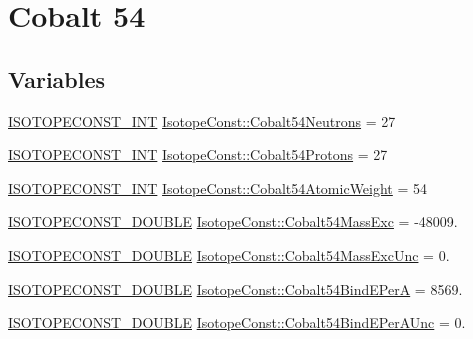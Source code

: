 \hypertarget{group___isotope_const-_cobalt-_co54}{}\section{Cobalt 54}
\label{group___isotope_const-_cobalt-_co54}
\subsection*{Variables}
\begin{DoxyCompactItemize}
\item 
\mbox{\hyperlink{group___isotope_const-_macros_ga5f18360b3e99483a35c32d789e62621c}{I\+S\+O\+T\+O\+P\+E\+C\+O\+N\+S\+T\+\_\+\+I\+NT}} \mbox{\hyperlink{group___isotope_const-_cobalt-_co54_ga5bce8fc322dd45ec0310e49514c6e6ec}{Isotope\+Const\+::\+Cobalt54\+Neutrons}} = 27
\item 
\mbox{\hyperlink{group___isotope_const-_macros_ga5f18360b3e99483a35c32d789e62621c}{I\+S\+O\+T\+O\+P\+E\+C\+O\+N\+S\+T\+\_\+\+I\+NT}} \mbox{\hyperlink{group___isotope_const-_cobalt-_co54_gaba4b7c7ce3abd41d7bd558b2879605fd}{Isotope\+Const\+::\+Cobalt54\+Protons}} = 27
\item 
\mbox{\hyperlink{group___isotope_const-_macros_ga5f18360b3e99483a35c32d789e62621c}{I\+S\+O\+T\+O\+P\+E\+C\+O\+N\+S\+T\+\_\+\+I\+NT}} \mbox{\hyperlink{group___isotope_const-_cobalt-_co54_ga1110cc20dc4a57d43c7eca903986067c}{Isotope\+Const\+::\+Cobalt54\+Atomic\+Weight}} = 54
\item 
\mbox{\hyperlink{group___isotope_const-_macros_ga8f45a7272ce02c0b4c65c44636ed719a}{I\+S\+O\+T\+O\+P\+E\+C\+O\+N\+S\+T\+\_\+\+D\+O\+U\+B\+LE}} \mbox{\hyperlink{group___isotope_const-_cobalt-_co54_ga0fdecb4aae12a7dc13ac787afb2917a1}{Isotope\+Const\+::\+Cobalt54\+Mass\+Exc}} = -\/48009.
\item 
\mbox{\hyperlink{group___isotope_const-_macros_ga8f45a7272ce02c0b4c65c44636ed719a}{I\+S\+O\+T\+O\+P\+E\+C\+O\+N\+S\+T\+\_\+\+D\+O\+U\+B\+LE}} \mbox{\hyperlink{group___isotope_const-_cobalt-_co54_gac0f16dce8a2ceaa2545490610eef9ef9}{Isotope\+Const\+::\+Cobalt54\+Mass\+Exc\+Unc}} = 0.
\item 
\mbox{\hyperlink{group___isotope_const-_macros_ga8f45a7272ce02c0b4c65c44636ed719a}{I\+S\+O\+T\+O\+P\+E\+C\+O\+N\+S\+T\+\_\+\+D\+O\+U\+B\+LE}} \mbox{\hyperlink{group___isotope_const-_cobalt-_co54_ga73f0d97758936d445b349c5c3ea08e1d}{Isotope\+Const\+::\+Cobalt54\+Bind\+E\+PerA}} = 8569.
\item 
\mbox{\hyperlink{group___isotope_const-_macros_ga8f45a7272ce02c0b4c65c44636ed719a}{I\+S\+O\+T\+O\+P\+E\+C\+O\+N\+S\+T\+\_\+\+D\+O\+U\+B\+LE}} \mbox{\hyperlink{group___isotope_const-_cobalt-_co54_ga364c55c0fcf447f436af1b0210d0d5de}{Isotope\+Const\+::\+Cobalt54\+Bind\+E\+Per\+A\+Unc}} = 0.

\end{DoxyCompactItemize}
